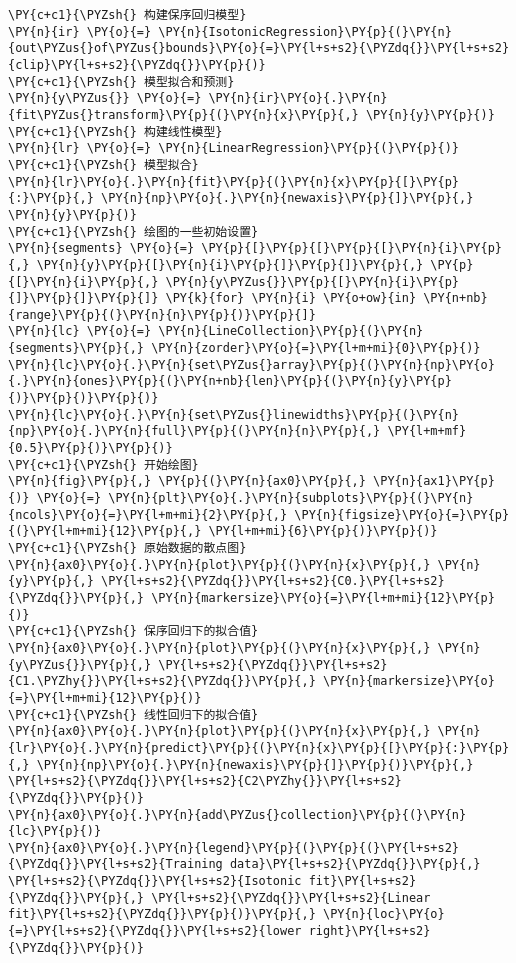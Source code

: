 \begin{Verbatim}[commandchars=\\\{\}]
\PY{c+c1}{\PYZsh{} 构建保序回归模型}
\PY{n}{ir} \PY{o}{=} \PY{n}{IsotonicRegression}\PY{p}{(}\PY{n}{out\PYZus{}of\PYZus{}bounds}\PY{o}{=}\PY{l+s+s2}{\PYZdq{}}\PY{l+s+s2}{clip}\PY{l+s+s2}{\PYZdq{}}\PY{p}{)}
\PY{c+c1}{\PYZsh{} 模型拟合和预测}
\PY{n}{y\PYZus{}} \PY{o}{=} \PY{n}{ir}\PY{o}{.}\PY{n}{fit\PYZus{}transform}\PY{p}{(}\PY{n}{x}\PY{p}{,} \PY{n}{y}\PY{p}{)}
\PY{c+c1}{\PYZsh{} 构建线性模型}
\PY{n}{lr} \PY{o}{=} \PY{n}{LinearRegression}\PY{p}{(}\PY{p}{)}
\PY{c+c1}{\PYZsh{} 模型拟合}
\PY{n}{lr}\PY{o}{.}\PY{n}{fit}\PY{p}{(}\PY{n}{x}\PY{p}{[}\PY{p}{:}\PY{p}{,} \PY{n}{np}\PY{o}{.}\PY{n}{newaxis}\PY{p}{]}\PY{p}{,} \PY{n}{y}\PY{p}{)}
\PY{c+c1}{\PYZsh{} 绘图的一些初始设置}
\PY{n}{segments} \PY{o}{=} \PY{p}{[}\PY{p}{[}\PY{p}{[}\PY{n}{i}\PY{p}{,} \PY{n}{y}\PY{p}{[}\PY{n}{i}\PY{p}{]}\PY{p}{]}\PY{p}{,} \PY{p}{[}\PY{n}{i}\PY{p}{,} \PY{n}{y\PYZus{}}\PY{p}{[}\PY{n}{i}\PY{p}{]}\PY{p}{]}\PY{p}{]} \PY{k}{for} \PY{n}{i} \PY{o+ow}{in} \PY{n+nb}{range}\PY{p}{(}\PY{n}{n}\PY{p}{)}\PY{p}{]}
\PY{n}{lc} \PY{o}{=} \PY{n}{LineCollection}\PY{p}{(}\PY{n}{segments}\PY{p}{,} \PY{n}{zorder}\PY{o}{=}\PY{l+m+mi}{0}\PY{p}{)}
\PY{n}{lc}\PY{o}{.}\PY{n}{set\PYZus{}array}\PY{p}{(}\PY{n}{np}\PY{o}{.}\PY{n}{ones}\PY{p}{(}\PY{n+nb}{len}\PY{p}{(}\PY{n}{y}\PY{p}{)}\PY{p}{)}\PY{p}{)}
\PY{n}{lc}\PY{o}{.}\PY{n}{set\PYZus{}linewidths}\PY{p}{(}\PY{n}{np}\PY{o}{.}\PY{n}{full}\PY{p}{(}\PY{n}{n}\PY{p}{,} \PY{l+m+mf}{0.5}\PY{p}{)}\PY{p}{)}
\PY{c+c1}{\PYZsh{} 开始绘图}
\PY{n}{fig}\PY{p}{,} \PY{p}{(}\PY{n}{ax0}\PY{p}{,} \PY{n}{ax1}\PY{p}{)} \PY{o}{=} \PY{n}{plt}\PY{o}{.}\PY{n}{subplots}\PY{p}{(}\PY{n}{ncols}\PY{o}{=}\PY{l+m+mi}{2}\PY{p}{,} \PY{n}{figsize}\PY{o}{=}\PY{p}{(}\PY{l+m+mi}{12}\PY{p}{,} \PY{l+m+mi}{6}\PY{p}{)}\PY{p}{)}
\PY{c+c1}{\PYZsh{} 原始数据的散点图}
\PY{n}{ax0}\PY{o}{.}\PY{n}{plot}\PY{p}{(}\PY{n}{x}\PY{p}{,} \PY{n}{y}\PY{p}{,} \PY{l+s+s2}{\PYZdq{}}\PY{l+s+s2}{C0.}\PY{l+s+s2}{\PYZdq{}}\PY{p}{,} \PY{n}{markersize}\PY{o}{=}\PY{l+m+mi}{12}\PY{p}{)}
\PY{c+c1}{\PYZsh{} 保序回归下的拟合值}
\PY{n}{ax0}\PY{o}{.}\PY{n}{plot}\PY{p}{(}\PY{n}{x}\PY{p}{,} \PY{n}{y\PYZus{}}\PY{p}{,} \PY{l+s+s2}{\PYZdq{}}\PY{l+s+s2}{C1.\PYZhy{}}\PY{l+s+s2}{\PYZdq{}}\PY{p}{,} \PY{n}{markersize}\PY{o}{=}\PY{l+m+mi}{12}\PY{p}{)}
\PY{c+c1}{\PYZsh{} 线性回归下的拟合值}
\PY{n}{ax0}\PY{o}{.}\PY{n}{plot}\PY{p}{(}\PY{n}{x}\PY{p}{,} \PY{n}{lr}\PY{o}{.}\PY{n}{predict}\PY{p}{(}\PY{n}{x}\PY{p}{[}\PY{p}{:}\PY{p}{,} \PY{n}{np}\PY{o}{.}\PY{n}{newaxis}\PY{p}{]}\PY{p}{)}\PY{p}{,} \PY{l+s+s2}{\PYZdq{}}\PY{l+s+s2}{C2\PYZhy{}}\PY{l+s+s2}{\PYZdq{}}\PY{p}{)}
\PY{n}{ax0}\PY{o}{.}\PY{n}{add\PYZus{}collection}\PY{p}{(}\PY{n}{lc}\PY{p}{)}
\PY{n}{ax0}\PY{o}{.}\PY{n}{legend}\PY{p}{(}\PY{p}{(}\PY{l+s+s2}{\PYZdq{}}\PY{l+s+s2}{Training data}\PY{l+s+s2}{\PYZdq{}}\PY{p}{,} \PY{l+s+s2}{\PYZdq{}}\PY{l+s+s2}{Isotonic fit}\PY{l+s+s2}{\PYZdq{}}\PY{p}{,} \PY{l+s+s2}{\PYZdq{}}\PY{l+s+s2}{Linear fit}\PY{l+s+s2}{\PYZdq{}}\PY{p}{)}\PY{p}{,} \PY{n}{loc}\PY{o}{=}\PY{l+s+s2}{\PYZdq{}}\PY{l+s+s2}{lower right}\PY{l+s+s2}{\PYZdq{}}\PY{p}{)}

\end{Verbatim}
